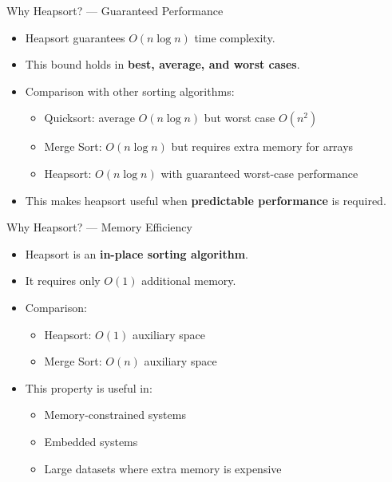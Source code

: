 \documentclass[14pt,aspectratio=1610]{beamer}
\begin{document}
\begin{frame}{Why Heapsort? --- Guaranteed Performance}
  \begin{itemize}
\item Heapsort guarantees \(O(n \log n)\) time complexity.
\item This bound holds in \textbf{best, average, and worst cases}.
\item Comparison with other sorting algorithms:
\begin{itemize}
\item Quicksort: average \(O(n \log n)\) but worst case \(O(n^2)\)
\item Merge Sort: \(O(n \log n)\) but requires extra memory for arrays
\item Heapsort: \(O(n \log n)\) with guaranteed worst-case performance
\end{itemize}
\item This makes heapsort useful when \textbf{predictable performance} is required.
\end{itemize}
\end{frame}

\begin{frame}{Why Heapsort? --- Memory Efficiency}
\begin{itemize}
\item Heapsort is an \textbf{in-place sorting algorithm}.
\item It requires only \(O(1)\) additional memory.
\item Comparison:
\begin{itemize}
\item Heapsort: \(O(1)\) auxiliary space
\item Merge Sort: \(O(n)\) auxiliary space
\end{itemize}
\item This property is useful in:
\begin{itemize}
\item Memory-constrained systems
\item Embedded systems
\item Large datasets where extra memory is expensive
\end{itemize}
\end{itemize}
\end{frame}
\end{document}
